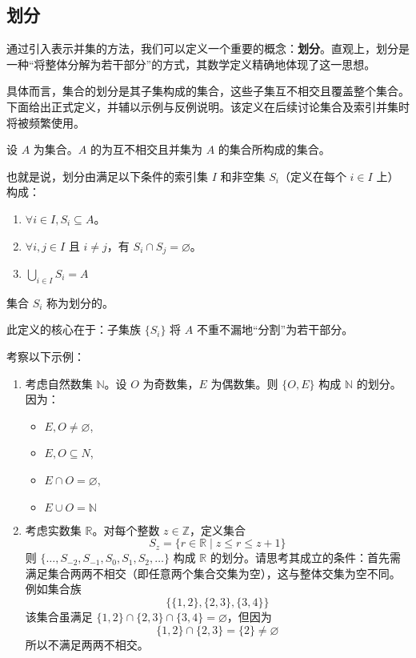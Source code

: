 \subsection{划分}

通过引入表示并集的方法，我们可以定义一个重要的概念：\textbf{划分}。直观上，划分是一种``将整体分解为若干部分''的方式，其数学定义精确地体现了这一思想。

具体而言，集合的划分是其子集构成的集合，这些子集互不相交且覆盖整个集合。下面给出正式定义，并辅以示例与反例说明。该定义在后续讨论集合及索引并集时将被频繁使用。

\begin{definition}\label{def:definition3.6.9}
    设 $A$ 为集合。$A$ 的为互不相交且并集为 $A$ 的集合所构成的集合。

    也就是说，划分由满足以下条件的索引集 $I$ 和非空集 $S_i$（定义在每个 $i \in I$ 上）构成：
    \begin{enumerate}[label=(\arabic*)]
        \item $\forall i \in I, S_i \subseteq A$。
        \item $\forall i, j \in I$ 且 $i \ne j$，有 $S_i \cap S_j = \varnothing$。
        \item $\displaystyle \bigcup_{i \in I} S_i = A$
    \end{enumerate}
    集合 $S_i$ 称为划分的。
\end{definition}

此定义的核心在于：子集族 $\{S_i\}$ 将 $A$ 不重不漏地``分割''为若干部分。

\begin{example}
    考察以下示例：
    \begin{enumerate}[label=(\arabic*)]
        \item 考虑自然数集 $\mathbb{N}$。设 $O$ 为奇数集，$E$ 为偶数集。则 $\{O, E\}$ 构成 $\mathbb{N}$ 的划分。因为：
        \begin{itemize}
            \item $E, O \ne \varnothing$,
            \item $E, O \subseteq N$,
            \item $E \cap O = \varnothing$,
            \item $E \cup O = \mathbb{N}$ 
        \end{itemize}
        \item 考虑实数集 $\mathbb{R}$。对每个整数 $z \in \mathbb{Z}$，定义集合
        \[S_z = \{r \in \mathbb{R} \mid z \le r \le z + 1\}\]
        则 $\{\dots, S_{-2}, S_{-1}, S_0, S_1, S_2, \dots \}$ 构成 $\mathbb{R}$ 的划分。请思考其成立的条件：首先需满足集合两两不相交（即任意两个集合交集为空），这与整体交集为空不同。例如集合族
        \[\big\{\{1, 2\}, \{2, 3\}, \{3, 4\}\big\}\]
        该集合虽满足 $\{1, 2\} \cap \{2, 3\} \cap \{3, 4\} = \varnothing$，但因为
        \[\{1, 2\} \cap \{2, 3\} = \{2\} \ne \varnothing\]
        所以不满足两两不相交。
    \end{enumerate}
\end{example}

